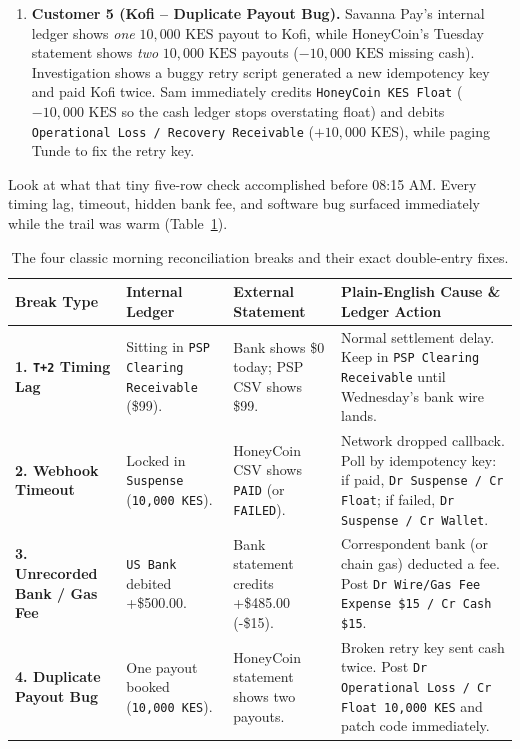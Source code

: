 \begin{enumerate}
  \item \textbf{Customer 5 (Kofi -- Duplicate Payout Bug).} Savanna Pay's internal ledger shows \emph{one} $10{,}000\text{ KES}$ payout to Kofi, while HoneyCoin's Tuesday statement shows \emph{two} $10{,}000\text{ KES}$ payouts ($-10{,}000\text{ KES}$ missing cash). Investigation shows a buggy retry script generated a new idempotency key and paid Kofi twice. Sam immediately credits \texttt{HoneyCoin KES Float} ($-10{,}000\text{ KES}$ so the cash ledger stops overstating float) and debits \texttt{Operational Loss / Recovery Receivable} ($+10{,}000\text{ KES}$), while paging Tunde to fix the retry key.
\end{enumerate}

Look at what that tiny five-row check accomplished before 08:15 AM. Every timing lag, timeout, hidden bank fee, and software bug surfaced immediately while the trail was warm (Table~\ref{tab:recon-exceptions}).

\begin{table}[htbp]
\centering
\caption{The four classic morning reconciliation breaks and their exact double-entry fixes.}
\label{tab:recon-exceptions}
\small
\setlength{\tabcolsep}{4.2pt}
\begin{tabular}{p{2.5cm}p{2.9cm}p{2.9cm}p{5.5cm}}
\toprule
\textbf{Break Type} & \textbf{Internal Ledger} & \textbf{External Statement} & \textbf{Plain-English Cause \& Ledger Action} \\
\midrule
\textbf{1. \texttt{T+2} Timing Lag} & Sitting in \texttt{PSP Clearing Receivable} (\$99). & Bank shows \$0 today; PSP CSV shows \$99. & Normal settlement delay. Keep in \texttt{PSP Clearing Receivable} until Wednesday's bank wire lands. \\
\addlinespace
\textbf{2. Webhook Timeout} & Locked in \texttt{Suspense} (\texttt{10,000 KES}). & HoneyCoin CSV shows \texttt{PAID} (or \texttt{FAILED}). & Network dropped callback. Poll by idempotency key: if paid, \texttt{Dr Suspense / Cr Float}; if failed, \texttt{Dr Suspense / Cr Wallet}. \\
\addlinespace
\textbf{3. Unrecorded Bank / Gas Fee} & \texttt{US Bank} debited +\$500.00. & Bank statement credits +\$485.00 (-\$15). & Correspondent bank (or chain gas) deducted a fee. Post \texttt{Dr Wire/Gas Fee Expense \$15 / Cr Cash \$15}. \\
\addlinespace
\textbf{4. Duplicate Payout Bug} & One payout booked (\texttt{10,000 KES}). & HoneyCoin statement shows two payouts. & Broken retry key sent cash twice. Post \texttt{Dr Operational Loss / Cr Float 10,000 KES} and patch code immediately. \\
\bottomrule
\end{tabular}
\end{table}

